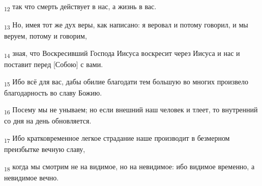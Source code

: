 \begin{tcolorbox}
\textsubscript{12} так что смерть действует в нас, а жизнь в вас.
\end{tcolorbox}
\begin{tcolorbox}
\textsubscript{13} Но, имея тот же дух веры, как написано: я веровал и потому говорил, и мы веруем, потому и говорим,
\end{tcolorbox}
\begin{tcolorbox}
\textsubscript{14} зная, что Воскресивший Господа Иисуса воскресит через Иисуса и нас и поставит перед [Собою] с вами.
\end{tcolorbox}
\begin{tcolorbox}
\textsubscript{15} Ибо всё для вас, дабы обилие благодати тем большую во многих произвело благодарность во славу Божию.
\end{tcolorbox}
\begin{tcolorbox}
\textsubscript{16} Посему мы не унываем; но если внешний наш человек и тлеет, то внутренний со дня на день обновляется.
\end{tcolorbox}
\begin{tcolorbox}
\textsubscript{17} Ибо кратковременное легкое страдание наше производит в безмерном преизбытке вечную славу,
\end{tcolorbox}
\begin{tcolorbox}
\textsubscript{18} когда мы смотрим не на видимое, но на невидимое: ибо видимое временно, а невидимое вечно.
\end{tcolorbox}
